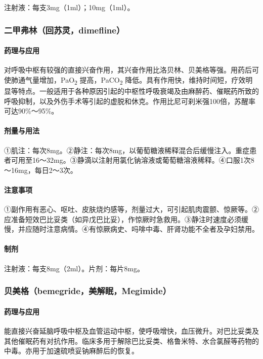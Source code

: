 注射液：每支3mg（1ml）；10mg（1ml）。

\subsubsection{二甲弗林（回苏灵，dimefline）}

\paragraph{药理与应用}

对呼吸中枢有较强的直接兴奋作用，其兴奋作用比洛贝林、贝美格等强。用药后可使肺通气量增加，PaO\textsubscript{2}
提高，PaCO\textsubscript{2}
降低。具有作用快，维持时间短，疗效明显等特点。一般适用于各种原因引起的中枢性呼吸衰竭及由麻醉药、催眠药所致的呼吸抑制，以及外伤手术等引起的虚脱和休克。作用比尼可刹米强100倍，苏醒率可达90\%～95\%。

\paragraph{剂量与用法}

①肌注：每次8mg。②静注：每次8mg，以葡萄糖液稀释混合后缓慢注入。重症患者可用至16～32mg。③静滴以注射用氯化钠溶液或葡萄糖溶液稀释。④口服1次8～16mg，每日2～3次。

\paragraph{注意事项}

①副作用有恶心、呕吐、皮肤烧灼感等，剂量过大，可引起肌肉震颤、惊厥等。②应准备短效巴比妥类（如异戊巴比妥），作惊厥时急救用。③静注时速度必须缓慢，并应随时注意病情。④有惊厥病史、吗啡中毒、肝肾功能不全者及孕妇禁用。

\paragraph{制剂}

注射液：每支8mg（2ml）。片剂：每片8mg。

\subsubsection{贝美格（bemegride，美解眠，Megimide）}

\paragraph{药理与应用}

能直接兴奋延脑呼吸中枢及血管运动中枢，使呼吸增快，血压微升。对巴比妥类及其他催眠药有对抗作用。临床多用于解除巴比妥类、格鲁米特、水合氯醛等药物的中毒。亦用于加速硫喷妥钠麻醉后的恢复。

